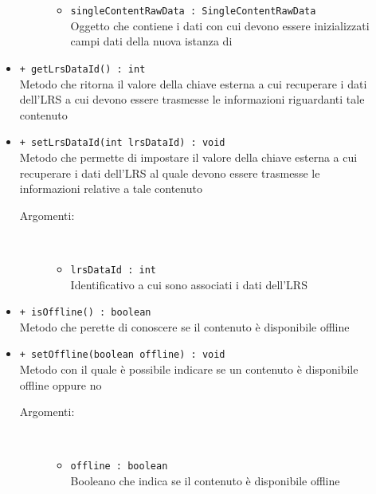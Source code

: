 \documentclass[../Tesi.tex]{subfiles}
\begin{document}
\begin{description}
\begin{itemize}
\begin{description}
\begin{itemize}
						\item \texttt{singleContentRawData : SingleContentRawData}\\
						Oggetto che contiene i dati con cui devono essere inizializzati campi dati della nuova istanza di 
					\end{itemize}
				\end{description}

				\item \texttt{+ getLrsDataId() : int}\\
				Metodo che ritorna il valore della chiave esterna a cui recuperare i dati dell'LRS a cui devono essere trasmesse le informazioni riguardanti tale contenuto

				\item \texttt{+ setLrsDataId(int lrsDataId) : void}\\
				Metodo che permette di impostare il valore della chiave esterna a cui recuperare i dati dell'LRS al quale devono essere trasmesse le informazioni relative a tale contenuto
				\begin{description}
					\item[Argomenti:] \
					\begin{itemize}
						\item \texttt{lrsDataId : int}\\
						Identificativo a cui sono associati i dati dell'LRS
					\end{itemize}
				\end{description}

				\item \texttt{+ isOffline() : boolean}\\
				Metodo che perette di conoscere se il contenuto è disponibile offline

				\item \texttt{+ setOffline(boolean offline) : void}\\
				Metodo con il quale è possibile indicare se un contenuto è disponibile offline oppure no
				\begin{description}
					\item[Argomenti:] \
					\begin{itemize}
						\item \texttt{offline : boolean}\\
						Booleano che indica se il contenuto è disponibile offline
					\end{itemize}
				\end{description}


\end{itemize}
\end{description}
\end{document}

